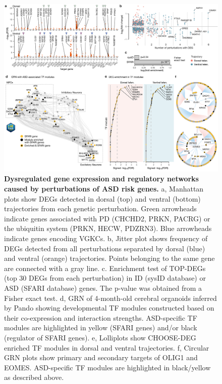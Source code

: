 \begin{figure}[b!]
    \centering
	\includegraphics[width=\textwidth]{figures/asd/Figure_3}
    \caption{\textbf{Dysregulated gene expression and regulatory networks caused by perturbations of ASD risk genes.}
    a, Manhattan plots show DEGs detected in dorsal (top) and ventral (bottom) trajectories from each genetic perturbation. Green arrowheads indicate genes associated with PD (CHCHD2, PRKN, PACRG) or the ubiquitin system (PRKN, HECW, PDZRN3). Blue arrowheads indicate genes encoding VGKCs. b, Jitter plot shows frequency of DEGs detected from all perturbations separated by dorsal (blue) and ventral (orange) trajectories. Points belonging to the same gene are connected with a gray line. c. Enrichment test of TOP-DEGs (top 30 DEGs from each perturbation) in ID (sysID database) or ASD (SFARI database) genes. The p-value was obtained from a Fisher exact test. d, GRN of 4-month-old cerebral organoids inferred by Pando showing developmental TF modules constructed based on their co-expression and interaction strengths. ASD-specific TF modules are highlighted in yellow (SFARI genes) and/or black (regulator of SFARI genes). e, Lolliplots show CHOOSE-DEG enriched TF modules in dorsal and ventral trajectories. f, Circular GRN plots show primary and secondary targets of OLIG1 and EOMES. ASD-specific TF modules are highlighted in black/yellow as described above.}
    \label{fig:asd3}
\end{figure}

